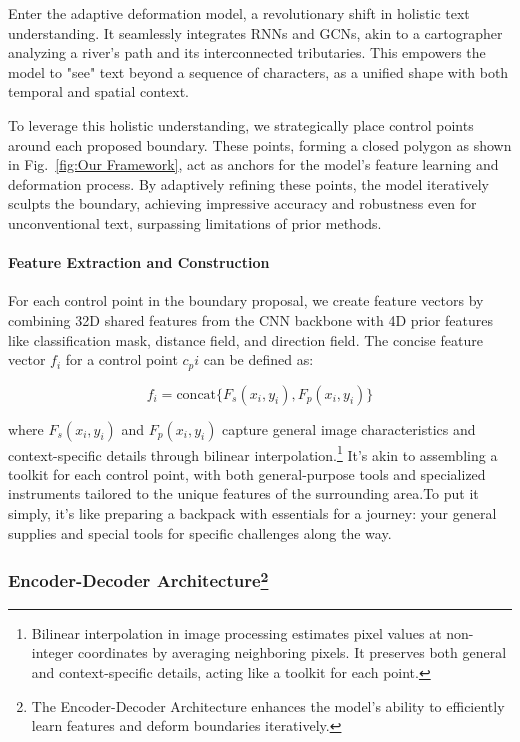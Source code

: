 \documentclass[default,iicol]{sn-jnl}%
\begin{document}
Enter the adaptive deformation model, a revolutionary shift in holistic text understanding. It seamlessly integrates RNNs and GCNs, akin to a cartographer analyzing a river's path and its interconnected tributaries. This empowers the model to "see" text beyond a sequence of characters, as a unified shape with both temporal and spatial context.

To leverage this holistic understanding, we strategically place control points around each proposed boundary. These points, forming a closed polygon as shown in Fig.~\ref{fig:Our Framework}, act as anchors for the model's feature learning and deformation process. By adaptively refining these points, the model iteratively sculpts the boundary, achieving impressive accuracy and robustness even for unconventional text, surpassing limitations of prior methods.

\paragraph{Feature Extraction and Construction}
For each control point in the boundary proposal, we create feature vectors by combining 32D shared features from the CNN backbone with 4D prior features like classification mask, distance field, and direction field. The concise feature vector $f_i$ for a control point $c_pi$ can be defined as:

\begin{equation}
	f_i = \text{concat}\{F_s(x_i, y_i), F_p(x_i, y_i)\}
\end{equation}

where $F_s(x_i, y_i)$ and $F_p(x_i, y_i)$ capture general image characteristics and context-specific details through bilinear interpolation.\protect\footnote{Bilinear interpolation in image processing estimates pixel values at non-integer coordinates by averaging neighboring pixels. It preserves both general and context-specific details, acting like a toolkit for each point.} It's akin to assembling a toolkit for each control point, with both general-purpose tools and specialized instruments tailored to the unique features of the surrounding area.To put it simply, it's like preparing a backpack with essentials for a journey: your general supplies and special tools for specific challenges along the way.

\subsubsection*{Encoder-Decoder Architecture\protect\footnote{The Encoder-Decoder Architecture enhances the model's ability to efficiently learn features and deform boundaries iteratively.}}
\end{document}
